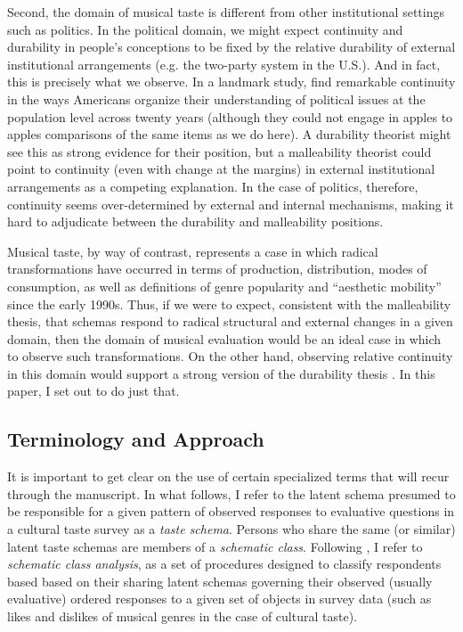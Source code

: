 \documentclass[preprint, authoryear,11pt, 3p]{elsarticle}
\begin{document}
Second, the domain of musical taste is different from other institutional settings such as politics. In the political domain, we might expect continuity and durability in people's conceptions to be fixed by the relative durability of external institutional arrangements (e.g. the two-party system in the U.S.). And in fact, this is precisely what we observe. In a landmark study, \citet{baldassarri2014neither} find remarkable continuity in the ways Americans organize their understanding of political issues at the population level across twenty years (although they could not engage in apples to apples comparisons of the same items as we do here). A durability theorist might see this as strong evidence for their position, but a malleability theorist could point to continuity (even with change at the margins) in external institutional arrangements as a competing explanation. In the case of politics, therefore, continuity seems over-determined by external and internal mechanisms, making it hard to adjudicate between the durability and malleability positions. 

Musical taste, by way of contrast, represents a case in which radical transformations have occurred in terms of production, distribution, modes of consumption, as well as definitions of genre popularity and ``aesthetic mobility'' \citep{baumann2001intellectualization} since the early 1990s. Thus, if we were to expect, consistent with the malleability thesis, that schemas respond to radical structural and external changes in a given domain, then the domain of musical evaluation would be an ideal case in which to observe such transformations. On the other hand, observing relative continuity in this domain would support a strong version of the durability thesis \citep{vaisey2016cultural}. In this paper, I set out to do just that. 

\subsection{Terminology and Approach}
It is important to get clear on the use of certain specialized terms that will recur through the manuscript. In what follows, I refer to the latent schema presumed to be responsible for a given pattern of observed responses to evaluative questions in a cultural taste survey as a \emph{taste schema}. Persons who share the same (or similar) latent taste schemas are members of a \emph{schematic class}. Following \citep{boutyline2017improving}, I refer to \emph{schematic class analysis}, as a set of procedures designed to classify respondents based based on their sharing latent schemas governing their observed (usually evaluative) ordered responses to a given set of objects in survey data (such as likes and dislikes of musical genres in the case of cultural taste). 
\end{document}
